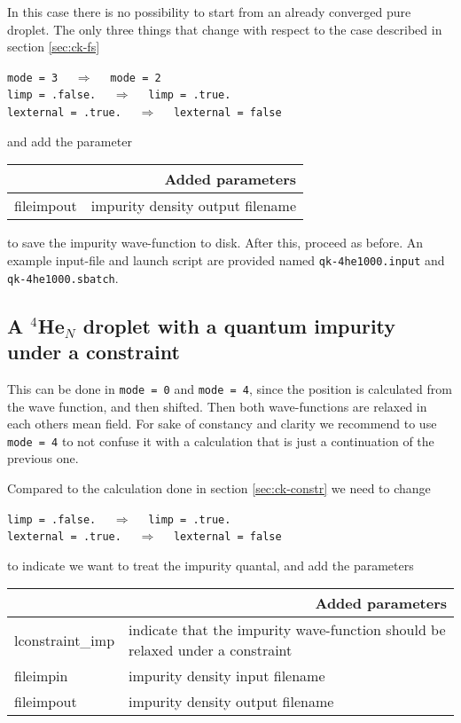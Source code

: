\documentclass[10pt,a4paper]{article}
\begin{document}
	In this case there is no possibility to start from an already converged pure droplet. The only three things that change with respect to the case described in section \ref{sec:ck-fs}
	\begin{center}
		\verb|mode = 3|	$\quad\Longrightarrow\quad$	\verb|mode = 2| \\
		\verb|limp = .false.|	$\quad\Longrightarrow\quad$	\verb|limp = .true.| \\
		\verb|lexternal = .true.|	$\quad\Longrightarrow\quad$	\verb|lexternal = false|
	\end{center}
	
	and add the parameter
	\begin{center}
		\begin{tabular}{l|p{9.75cm}}
			\multicolumn{2}{r}{\textbf{Added parameters}} \\
			\hline\hline
			fileimpout			&  impurity density output filename  
		\end{tabular}
	\end{center}
	to save the impurity wave-function to disk. After this, proceed as before. An example input-file and launch script are provided named \verb|qk-4he1000.input| and \verb|qk-4he1000.sbatch|.
	
	\subsection{A $^4$He$_{N}$ droplet with a quantum impurity under a constraint}
	
	This can be done in \verb|mode = 0| and \verb|mode = 4|, since the position is calculated from the wave function, and then shifted. Then both wave-functions are relaxed in each others mean field. For sake of constancy and clarity we recommend to use \verb|mode = 4| to not confuse it with a calculation that is just a continuation of the previous one.
	
	Compared to the calculation done in section \ref{sec:ck-constr} we need to change
	
	\begin{center}
		\verb|limp = .false.|	$\quad\Longrightarrow\quad$	\verb|limp = .true.| \\
		\verb|lexternal = .true.|	$\quad\Longrightarrow\quad$	\verb|lexternal = false|
	\end{center}
	
	to indicate we want to treat the impurity quantal, and add the parameters
	
	\begin{center}
		\begin{tabular}{l|p{9.75cm}}
			\multicolumn{2}{r}{\textbf{Added parameters}} \\
			\hline\hline
			lconstraint\_imp			&  indicate that the impurity wave-function should be relaxed under a constraint  \\
			fileimpin		&	impurity density input filename \\
			fileimpout		&	impurity density output filename
		\end{tabular}
	\end{center}
	
\end{document}
